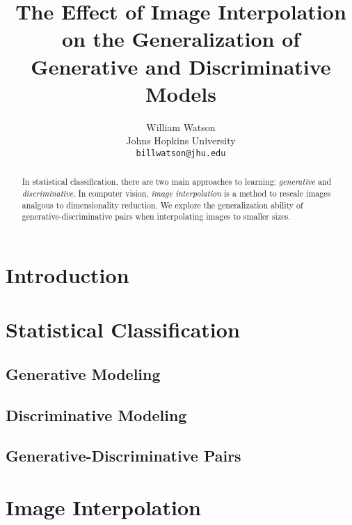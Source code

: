 \documentclass{article}
\title{The Effect of Image Interpolation on the Generalization of Generative and Discriminative Models}
\author{%
  William Watson \\
  Johns Hopkins University\\
  \texttt{billwatson@jhu.edu} \\
}
\begin{document}

\maketitle

\begin{abstract}
  In statistical classification, there are two main approaches to learning:
  \textit{generative} and \textit{discriminative}. In computer vision,
  \textit{image interpolation} is a method to rescale images analgous to
  dimensionality reduction. We explore the generalization ability of
  generative-discriminative pairs when interpolating images to smaller sizes.
\end{abstract}


\section{Introduction}
\label{sec:intro}


\section{Statistical Classification}
\subsection{Generative Modeling}
\label{sec:gen-modeling}
\subsection{Discriminative Modeling}
\label{sec:discrim-modeling}
\subsection{Generative-Discriminative Pairs}
\label{sec:gen-discrim-pairs}



\section{Image Interpolation}
\label{sec:img-interpolation}
\end{document}
